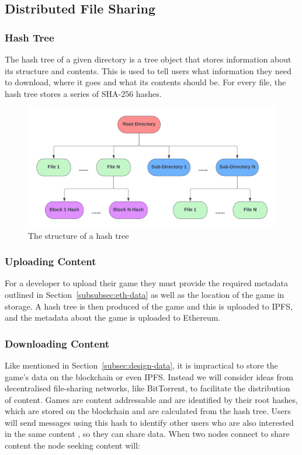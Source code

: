 \subsection{Distributed File Sharing}
\label{subsec:design-p2p}

\subsubsection*{Hash Tree}
\label{subsubsec:hash-tree}

The hash tree of a given directory is a tree object that stores information about its structure and contents. This is used to tell users what information they need to download, where it goes and what its contents should be. For every file, the hash tree stores a series of SHA-256 hashes. 

\begin{figure}[ht]
  \centering
  \includegraphics[width=.85\textwidth]{assets/images/diagrams/block-body.png}
  \caption{The structure of a hash tree}
  \label{fig:hash-storage}
\end{figure}

\subsubsection*{Uploading Content}
\label{subsubsec:upload-content}

For a developer to upload their game  they must provide the required metadata outlined in Section~\ref{subsubsec:eth-data} as well as the location of the game in storage. A hash tree is then produced of the game and this is uploaded to IPFS, and the metadata about the game is uploaded to Ethereum.

\subsubsection*{Downloading Content}

Like mentioned in Section~\ref{subsec:design-data}, it is impractical to store the game's data on the blockchain or even IPFS. Instead we will consider ideas from decentralised file-sharing networks, like BitTorrent, to facilitate the distribution of content.
\x
Games are content addressable and are identified by their root hashes, which are stored on the blockchain and are calculated from the hash tree. Users will send messages using this hash to identify other users who are also interested in the same content , so they can share data. When two nodes connect to share content the node seeking content will:

